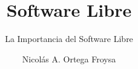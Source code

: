 \documentclass[xetex, mathserif, serif]{beamer}
\title{Software Libre}
\subtitle{La Importancia del Software Libre}
\author{Nicolás A. Ortega Froysa}
\institute{Universidad de Jáen}
\date{} %
\begin{document}
\frame{\titlepage}
\end{document}
